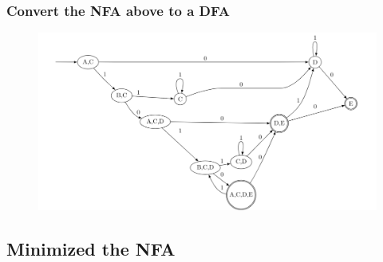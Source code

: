 \documentclass[a4paper]{exam}
\begin{document}
\subsubsection{Convert the NFA above to a DFA}

\begin{figure}[h]
    \centering
    \includegraphics[width=0.7\columnwidth]{1.7.2-solution.png}
\end{figure}
\begin{solution}

\end{solution}

\subsection{Minimized the NFA}
\end{document}
